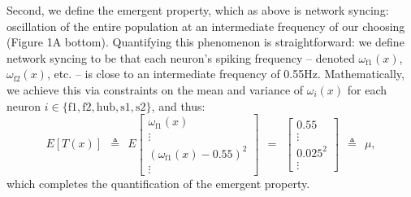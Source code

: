 \documentclass[11pt]{article}
\begin{document}
Second, we define the emergent property, which as above is network syncing: oscillation of the entire population at an intermediate frequency of our choosing (Figure 1A bottom).
Quantifying this phenomenon is straightforward: we define network syncing to be that each neuron's spiking frequency -- denoted $\omega_{\text{f1}}(x)$, $\omega_{\text{f2}}(x)$, etc. -- is close to an intermediate frequency of 0.55Hz.  
Mathematically, we achieve this via constraints on the mean and variance of $\omega_i(x)$ for each neuron $i \in \{ \text{f1}, \text{f2}, \text{hub}, \text{s1}, \text{s2} \}$, and thus:
\begin{equation}\label{eq:EP}
 E\left[T(x) \right] ~~\triangleq~~ E\begin{bmatrix} \omega_{\text{f1}}(x) \\ \vdots \\ (\omega_{\text{f1}}(x) - 0.55)^2 \\ \vdots \end{bmatrix} ~~=~~  
 \begin{bmatrix} 0.55 \\ \vdots \\ 0.025^2 \\ \vdots \end{bmatrix} ~~\triangleq~~ \mu,
 \end{equation}
  which completes the quantification of the emergent property.
\end{document}
